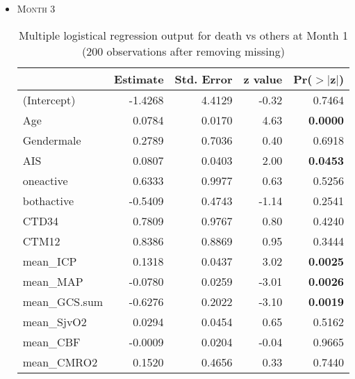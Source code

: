 \documentclass{article}
\begin{document}
\begin{itemize}
\item \textsc{Month 3}
\begin{table}[H]
\centering
\begin{tabular}{lrrrr}
  \hline
 & Estimate & Std. Error & z value & Pr($>$$|$z$|$) \\ 
  \hline
(Intercept) & -1.4268 & 4.4129 & -0.32 & 0.7464 \\ 
  Age & 0.0784 & 0.0170 & 4.63 & {\bf 0.0000} \\ 
  Gendermale & 0.2789 & 0.7036 & 0.40 & 0.6918 \\ 
  AIS & 0.0807 & 0.0403 & 2.00 & {\bf 0.0453} \\ 
  oneactive & 0.6333 & 0.9977 & 0.63 & 0.5256 \\ 
  bothactive & -0.5409 & 0.4743 & -1.14 & 0.2541 \\ 
  CTD34 & 0.7809 & 0.9767 & 0.80 & 0.4240 \\ 
  CTM12 & 0.8386 & 0.8869 & 0.95 & 0.3444 \\ 
  mean\_ICP & 0.1318 & 0.0437 & 3.02 & {\bf 0.0025} \\ 
  mean\_MAP & -0.0780 & 0.0259 & -3.01 & {\bf 0.0026} \\ 
  mean\_GCS.sum & -0.6276 & 0.2022 & -3.10 & {\bf 0.0019} \\ 
  mean\_SjvO2 & 0.0294 & 0.0454 & 0.65 & 0.5162 \\ 
  mean\_CBF & -0.0009 & 0.0204 & -0.04 & 0.9665 \\ 
  mean\_CMRO2 & 0.1520 & 0.4656 & 0.33 & 0.7440 \\ 
   \hline
\end{tabular}
\caption{Multiple logistical regression output for death vs others at Month 1 (200 observations after removing missing)}
\end{table}



\end{itemize}
\end{document}
